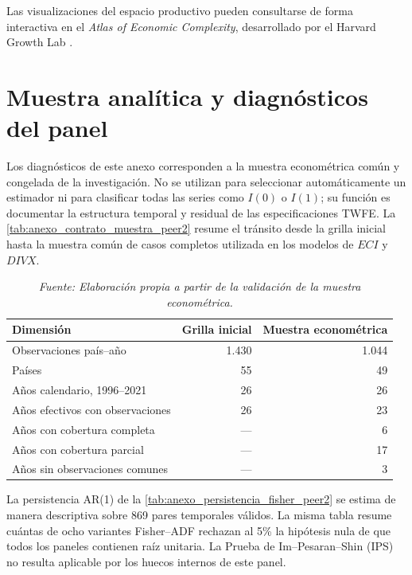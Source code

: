 \documentclass[../../TFM.tex]{subfiles}
\begin{document}
	Las visualizaciones del espacio productivo pueden consultarse de forma interactiva en el \textit{Atlas of Economic Complexity}, desarrollado por el Harvard Growth Lab \parencite{HarvardGrowthLab2024}.



	\section{Muestra analítica y diagnósticos del panel}
	\label{sec:anexo_diagnosticos_series_tiempo}

	Los diagnósticos de este anexo corresponden a la muestra econométrica común
	y congelada de la investigación. No se utilizan para seleccionar automáticamente un estimador ni
	para clasificar todas las series como $I(0)$ o $I(1)$; su función es
	documentar la estructura temporal y residual de las especificaciones TWFE.
	La \autoref{tab:anexo_contrato_muestra_peer2} resume el tránsito desde la
	grilla inicial hasta la muestra común de casos completos utilizada en los
	modelos de $ECI$ y $DIVX$.

	\begin{table}[htbp]
		\centering
		\small
		\caption{Contrato de la muestra econométrica común}
		\label{tab:anexo_contrato_muestra_peer2}
		\begin{tabular}{lrr}
			\toprule
			Dimensión & Grilla inicial & Muestra econométrica \\
			\midrule
			Observaciones país--año & 1.430 & 1.044 \\
			Países & 55 & 49 \\
			Años calendario, 1996--2021 & 26 & 26 \\
			Años efectivos con observaciones & 26 & 23 \\
			Años con cobertura completa & --- & 6 \\
			Años con cobertura parcial & --- & 17 \\
			Años sin observaciones comunes & --- & 3 \\
			\bottomrule
		\end{tabular}
		\caption*{\footnotesize \textit{Nota:} Los años sin observaciones comunes son 1997, 1999 y 2001. La muestra es idéntica para $ECI$ y $DIVX$, sigue la regla de casos completos y no utiliza imputación ni interpolación.}
		\caption*{\footnotesize \textit{Fuente: Elaboración propia a partir de la validación de la muestra econométrica.}}
	\end{table}

	La persistencia AR(1) de la \autoref{tab:anexo_persistencia_fisher_peer2}
	se estima de manera descriptiva sobre 869 pares temporales válidos. La misma
	tabla resume cuántas de ocho variantes Fisher--ADF rechazan al 5\% la
	hipótesis nula de que todos los paneles contienen raíz unitaria. La Prueba
	de Im--Pesaran--Shin (IPS) no resulta aplicable por los huecos internos de
	este panel.
\end{document}
